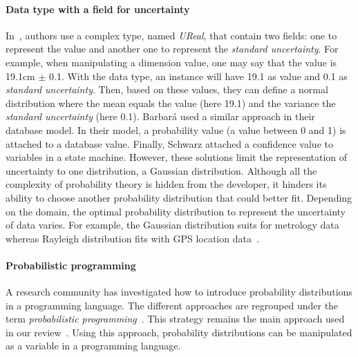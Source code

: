 \paragraph{Data type with a field for uncertainty}
In~\cite{DBLP:conf/models/BurguenoBMV18, DBLP:conf/ecmdafa/BertoaMBBTV18, DBLP:conf/sle/MayerhoferWV16, DBLP:conf/quatic/VallecilloMO16}, authors use a complex type, named \textit{UReal}, that contain two fields: one to represent the value and another one to represent the \textit{standard uncertainty}.
For example, when manipulating a dimension value, one may say that the value is 19.1cm $\pm$ 0.1. 
With the data type, an instance will have 19.1 as value and 0.1 as \textit{standard uncertainty}.
Then, based on these values, they can define a normal distribution where the mean equals the value (here 19.1) and the variance the \textit{standard uncertainty} (here 0.1).
Barbará \etal \cite{DBLP:journals/tkde/BarbaraGP92} used a similar approach in their database model.
In their model, a probability value (a value between 0 and 1) is attached to a database value.
Finally, Schwarz \etal \cite{DBLP:conf/uist/SchwarzMH11} attached a confidence value to variables in a state machine.
However, these solutions limit the representation of uncertainty to one distribution, \eg a Gaussian distribution.
Although all the complexity of probability theory is hidden from the developer, it hinders its ability to choose another probability distribution that could better fit.
Depending on the domain, the optimal probability distribution to represent the uncertainty of data varies. 
For example, the Gaussian distribution suits for metrology data~\cite{metrology2008evaluation} whereas Rayleigh distribution fits with GPS location data~\cite{bornholt2013abstractions}.

\paragraph{Probabilistic programming}
A research community has investigated how to introduce probability distributions in a programming language.
The different approaches are regrouped under the term \textit{probabilistic programming}~\cite{DBLP:conf/icse/GordonHNR14}.
This strategy remains the main approach used in our review~\cite{baudin2017openturns, DBLP:conf/asplos/BornholtMM14, DBLP:journals/corr/BorgstromGGMG13, osti_1430202, DBLP:journals/peerj-cs/SalvatierWF16, DBLP:conf/popl/BhatAVG12, DBLP:conf/aistats/ChagantyNR13, DBLP:journals/siamsc/JaroszewiczK12, DBLP:journals/toplas/ParkPT08, DBLP:conf/ijcai/Pfeffer01, DBLP:conf/popl/RamseyP02, DBLP:conf/pldi/SankaranarayananCG13, DBLP:conf/icra/Thrun00, DBLP:journals/sac/LunnTBS00, plummer2003jags}.
Using this approach, probability distributions can be manipulated as a variable in a programming language.

